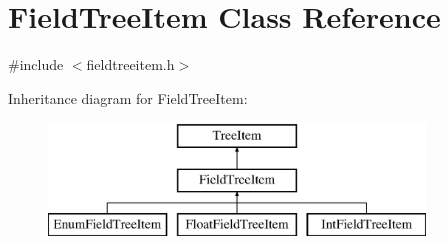 \hypertarget{class_field_tree_item}{\section{\-Field\-Tree\-Item \-Class \-Reference}
\label{class_field_tree_item}
}


{\ttfamily \#include $<$fieldtreeitem.\-h$>$}

\-Inheritance diagram for \-Field\-Tree\-Item\-:\begin{figure}[H]
\begin{center}
\leavevmode
\includegraphics[height=3.000000cm]{class_field_tree_item}
\end{center}
\end{figure}
